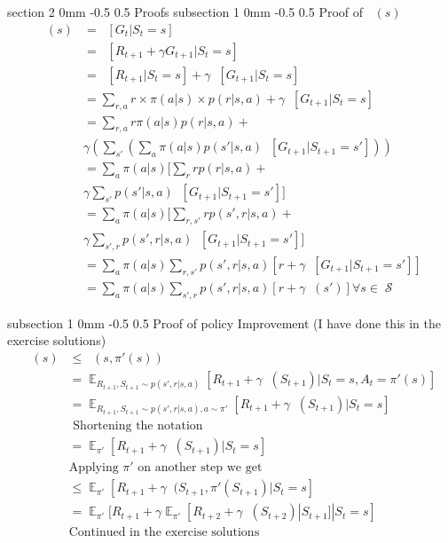 \documentclass[twocolumn,11pt]{article}
\makeatletter
\DeclareMathOperator{\E}{\mathbb{E}}
\DeclareMathOperator{\state}{\mathcal{S}}
\DeclareMathOperator{\qp}{q_\pi} %
\DeclareMathOperator{\vp}{v_\pi} %
\DeclareMathOperator{\Ep}{\E_\pi}
\renewcommand{\section}{\@startsection
{section}%
{2}%
{0mm}%
{-0.5\baselineskip}%
{0.5\baselineskip}%
{\bfseries\color{blue}}} %
\renewcommand{\subsection}{\@startsection
{subsection}%
{1}%
{0mm}%
{-0.5\baselineskip}%
{0.5\baselineskip}%
{\bfseries\color{blue}}} %
\makeatother
\begin{document}
\section{Proofs}
\subsection{Proof of $\vp(s)$}
\begin{align*}
	\vp(s) &= \Ep[G_t | S_t = s] \\
	&= \Ep [R_{t+1} + \gamma G_{t+1} | S_t = s]\\
	&= \Ep[R_{t+1}  | S_t= s] + \gamma \Ep[G_{t+1} | S_t= s]\\
	&= \sum_{r,  a} r \times \pi(a|s) \times p(r|s,a) + \gamma  \Ep[G_{t+1} | S_t= s]\\
	&= \sum_{r,  a} r \pi(a|s)  p(r|s,a) +\\
	& \gamma  ( \sum_{s'}( \sum_a \pi(a|s)p(s'|s,a)  \Ep[G_{t+1} | S_{t+1} = s']))\\
	&= \sum_a \pi(a|s) [  \sum_r r p(r|s,a) + \\
	&\gamma \sum_{s'}p(s'|s,a) \Ep[G_{t+1} | S_{t+1} = s']  ]\\
	&= \sum_a \pi(a|s) [  \sum_{r,s'} r p(s',r|s,a) +\\
	& \gamma \sum_{s',r}p(s',r|s,a) \Ep[G_{t+1} | S_{t+1} = s']  ]\\
	&= \sum_a \pi(a|s) \sum_{r,s'} p(s',r|s,a)[ r + \gamma \Ep[G_{t+1} | S_{t+1} = s']  ]\\
	&= \sum_a \pi(a|s) \sum_{s',r} p(s',r|s,a) [r + \gamma \vp(s')] \forall s \in \state
\end{align*}

\subsection{Proof of policy Improvement (I have done this in the exercise solutions)}
\begin{align*}
	\vp(s) & \leq \qp(s,\pi'(s))\\
	&= \E_{R_{t+1},S_{t+1} \sim p(s',r|s,a) }[ R_{t+1}+ \gamma \vp(S_{t+1}) | S_t = s, A_t = \pi'(s)]\\
	&= \E_{R_{t+1},S_{t+1} \sim p(s',r|s,a) ,a \sim \pi'}[ R_{t+1}+ \gamma \vp(S_{t+1}) | S_t = s]\\
	& \text{ Shortening the notation}\\
	&= \E_{\pi'}[ R_{t+1}+ \gamma \vp(S_{t+1}) | S_t = s]\\
	& \text{Applying $\pi'$ on another step we get}\\
	& \leq  \E_{\pi'}[ R_{t+1} + \gamma \qp(S_{t+1}, \pi'(S_{t+1}) | S_t = s]\\
	& = \E_{\pi'}[ R_{t+1} + \gamma  \E_{\pi'}[R_{t+2} + \gamma \vp(S_{t+2}) | S_{t+1}]    | S_t = s]\\
	&\text{Continued in the exercise solutions}
\end{align*}
\end{document}
